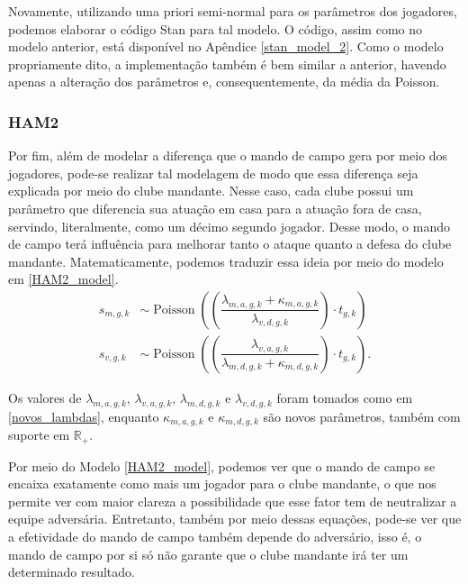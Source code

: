 Novamente, utilizando uma priori semi-normal para os parâmetros dos jogadores, podemos elaborar o código Stan para tal modelo. O código, assim como no modelo anterior, está disponível no Apêndice \ref{stan_model_2}. Como o modelo propriamente dito, a implementação também é bem similar a anterior, havendo apenas a alteração dos parâmetros e, consequentemente, da média da Poisson.

\subsubsection{HAM2}
\label{HAM2_text}

Por fim, além de modelar a diferença que o mando de campo gera por meio dos jogadores, pode-se realizar tal  modelagem de modo que essa diferença seja explicada por meio do clube mandante. Nesse caso, cada clube possui um parâmetro que diferencia sua atuação em casa para a atuação fora de casa, servindo, literalmente, como um décimo segundo jogador. Desse modo, o mando de campo terá influência para melhorar tanto o ataque quanto a defesa do clube mandante. Matematicamente, podemos traduzir essa ideia por meio do modelo em \ref{HAM2_model}.
\begin{equation}
    \begin{split}
    s_{m, g, k} & \sim \operatorname{Poisson}\left(\left(\dfrac{\lambda_{m,a,g,k} + \kappa_{m,a,g,k}}{\lambda_{v,d,g,k}}\right) \cdot t_{g,k}\right) \\
    s_{v, g, k} & \sim \operatorname{Poisson}\left(\left(\dfrac{\lambda_{v,a,g,k}}{\lambda_{m,d,g,k} + \kappa_{m,d,g,k}}\right) \cdot t_{g,k}\right).
    \end{split}
    \label{HAM2_model}
\end{equation}

Os valores de $\lambda_{m,a,g,k}$, $\lambda_{v,a,g,k}$, $\lambda_{m,d,g,k}$ e $\lambda_{v,d,g,k}$ foram tomados como em \ref{novos_lambdas}, enquanto $\kappa_{m,a,g,k}$ e $\kappa_{m,d,g,k}$ são novos parâmetros, também com suporte em $\mathds{R}_+$.

Por meio do Modelo \ref{HAM2_model}, podemos ver que o mando de campo se encaixa exatamente como mais um jogador para o clube mandante, o que nos permite ver com maior clareza a possibilidade que esse fator tem de neutralizar a equipe adversária. Entretanto, também por meio dessas equações, pode-se ver que a efetividade do mando de campo também depende do adversário, isso é, o mando de campo por si só não garante que o clube mandante irá ter um determinado resultado.

